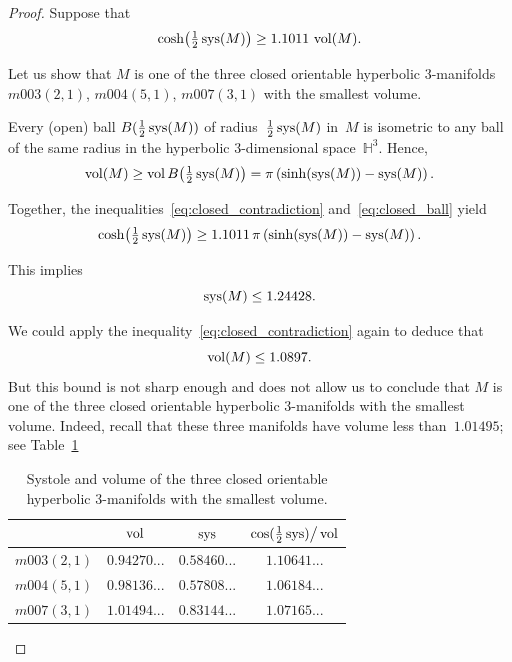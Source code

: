 \documentclass[11pt,reqno]{amsart}
\theoremstyle{definition}
\numberwithin{equation}{section}
\newcommand{\HH}{{\mathbb H}}
\DeclareMathOperator{\vol}{{\rm vol}}
\DeclareMathOperator{\sys}{{\rm sys}}
\numberwithin{equation}{section}
\begin{document}
\begin{proof}
Suppose that 
\begin{equation} \label{eq:closed_contradiction}
\cosh \!\left(\tfrac{1}{2} \sys(M) \right) \geq 1.1011 \, \vol(M).
\end{equation}

Let us show that $M$ is one of the three closed orientable hyperbolic $3$-manifolds $m003(2,1)$, $m004(5,1)$, $m007(3,1)$ with the smallest volume.

Every (open) ball $B(\tfrac{1}{2} \sys(M))$ of radius~$\tfrac{1}{2} \sys(M)$ in~$M$ is isometric to any ball of the same radius in the hyperbolic $3$-dimensional space~$\HH^3$.
Hence,
\begin{equation} \label{eq:closed_ball}
\vol(M) \geq \vol B\!\left(\tfrac{1}{2} \sys(M)\right) = \pi  \left( \sinh(\sys(M)) - \sys(M) \right).
\end{equation}

Together, the inequalities~\eqref{eq:closed_contradiction} and~\eqref{eq:closed_ball} yield
\[
\cosh \!\left(\tfrac{1}{2} \sys(M) \right) \geq 1.1011 \, \pi \left( \sinh(\sys(M)) - \sys(M) \right).
\]

This implies
\begin{equation} \label{eq:closed_sys<1}
\sys(M) \leq 1.24428.
\end{equation}

We could apply the inequality~\eqref{eq:closed_contradiction} again to deduce that
\[
\vol(M) \leq 1.0897.
\]
But this bound is not sharp enough and does not allow us to conclude that $M$ is one of the three closed orientable hyperbolic $3$-manifolds with the smallest volume.
Indeed, recall that these three manifolds have volume less than~$1.01495$; see Table~\ref{table:3}


\begin{table}[hbpt]
\begin{center}
\begin{tabular}{ |c|c|c|c| } 
 \hline
 & $\vol$ & $\sys$ & $\cos(\tfrac{1}{2} \sys) \big/ \vol$ \\
  \hline
$m003(2,1)$ & $0.94270...$ & $0.58460...$ & $1.10641...$ \\
  \hline
$m004(5,1)$ & $0.98136...$ & $0.57808...$ & $1.06184...$ \\
   \hline
$m007(3,1)$ & $1.01494...$ & $0.83144...$ & $1.07165...$ \\ 
 \hline
\end{tabular}
\bigskip
\end{center}
\caption{Systole and volume of the three closed orientable hyperbolic $3$-manifolds with the smallest volume.} \label{table:3}
\end{table}





\end{proof}
\end{document}
